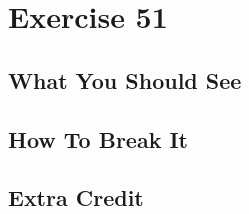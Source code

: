 \chapter{Exercise 51}


\section{What You Should See}


\section{How To Break It}


\section{Extra Credit}



